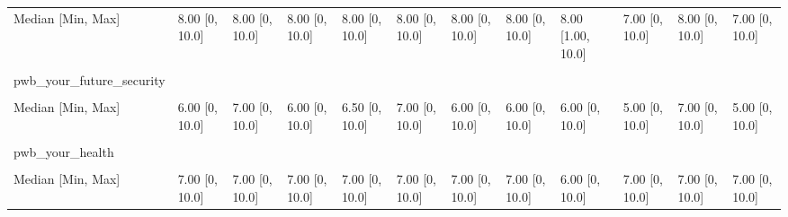 \documentclass[
  single column]{article}
\begin{document}
\begin{landscape}
\begin{longtable}[t]{llllllllllll}
Median [Min, Max] & 8.00 [0, 10.0] & 8.00 [0, 10.0] & 8.00 [0, 10.0] & 8.00 [0, 10.0] & 8.00 [0, 10.0] & 8.00 [0, 10.0] & 8.00 [0, 10.0] & 8.00 [1.00, 10.0] & 7.00 [0, 10.0] & 8.00 [0, 10.0] & 7.00 [0, 10.0]\\
\cellcolor{gray!10}{Missing} & \cellcolor{gray!10}{84 (0.4\%)} & \cellcolor{gray!10}{8 (0.6\%)} & \cellcolor{gray!10}{0 (0\%)} & \cellcolor{gray!10}{14 (0.7\%)} & \cellcolor{gray!10}{21 (0.6\%)} & \cellcolor{gray!10}{5 (0.5\%)} & \cellcolor{gray!10}{1 (0.7\%)} & \cellcolor{gray!10}{1 (1.1\%)} & \cellcolor{gray!10}{6 (0.9\%)} & \cellcolor{gray!10}{3 (0.5\%)} & \cellcolor{gray!10}{10 (1.3\%)}\\
\addlinespace
pwb\_your\_future\_security &  &  &  &  &  &  &  &  &  &  & \\
\cellcolor{gray!10}{Mean (SD)} & \cellcolor{gray!10}{5.82 (2.59)} & \cellcolor{gray!10}{6.41 (2.50)} & \cellcolor{gray!10}{5.69 (2.71)} & \cellcolor{gray!10}{6.08 (2.49)} & \cellcolor{gray!10}{6.19 (2.49)} & \cellcolor{gray!10}{5.97 (2.66)} & \cellcolor{gray!10}{5.79 (2.64)} & \cellcolor{gray!10}{5.59 (2.95)} & \cellcolor{gray!10}{5.53 (2.64)} & \cellcolor{gray!10}{6.34 (2.45)} & \cellcolor{gray!10}{5.20 (2.80)}\\
Median [Min, Max] & 6.00 [0, 10.0] & 7.00 [0, 10.0] & 6.00 [0, 10.0] & 6.50 [0, 10.0] & 7.00 [0, 10.0] & 6.00 [0, 10.0] & 6.00 [0, 10.0] & 6.00 [0, 10.0] & 5.00 [0, 10.0] & 7.00 [0, 10.0] & 5.00 [0, 10.0]\\
\cellcolor{gray!10}{Missing} & \cellcolor{gray!10}{113 (0.5\%)} & \cellcolor{gray!10}{11 (0.8\%)} & \cellcolor{gray!10}{1 (0.4\%)} & \cellcolor{gray!10}{15 (0.7\%)} & \cellcolor{gray!10}{22 (0.6\%)} & \cellcolor{gray!10}{11 (1.0\%)} & \cellcolor{gray!10}{2 (1.5\%)} & \cellcolor{gray!10}{1 (1.1\%)} & \cellcolor{gray!10}{14 (2.1\%)} & \cellcolor{gray!10}{2 (0.3\%)} & \cellcolor{gray!10}{6 (0.8\%)}\\
pwb\_your\_health &  &  &  &  &  &  &  &  &  &  & \\
\addlinespace
\cellcolor{gray!10}{Mean (SD)} & \cellcolor{gray!10}{6.43 (2.48)} & \cellcolor{gray!10}{6.62 (2.40)} & \cellcolor{gray!10}{6.36 (2.76)} & \cellcolor{gray!10}{6.51 (2.42)} & \cellcolor{gray!10}{6.54 (2.45)} & \cellcolor{gray!10}{6.22 (2.53)} & \cellcolor{gray!10}{6.78 (2.53)} & \cellcolor{gray!10}{5.96 (2.80)} & \cellcolor{gray!10}{6.87 (2.38)} & \cellcolor{gray!10}{6.61 (2.43)} & \cellcolor{gray!10}{5.95 (2.80)}\\
Median [Min, Max] & 7.00 [0, 10.0] & 7.00 [0, 10.0] & 7.00 [0, 10.0] & 7.00 [0, 10.0] & 7.00 [0, 10.0] & 7.00 [0, 10.0] & 7.00 [0, 10.0] & 6.00 [0, 10.0] & 7.00 [0, 10.0] & 7.00 [0, 10.0] & 7.00 [0, 10.0]\\

\end{longtable}
\end{landscape}
\end{document}
